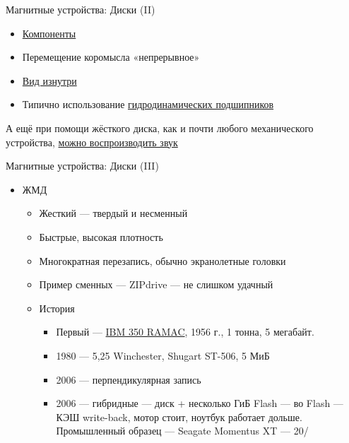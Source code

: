\documentclass[xetex,aspectratio=43]{beamer}
\begin{document}
\begin{frame}{Магнитные устройства: Диски (II)}

\begin{itemize}
\item
  \href{https://en.wikipedia.org/wiki/Hard_disk_drive\#Components}{Компоненты}
\item Перемещение коромысла «непрерывное»
\item
  \href{https://commons.wikimedia.org/w/index.php?title=File\%3AHardDisk1.ogv}{Вид
  изнутри}
\item
  Типично использование
  \href{https://ru.wikipedia.org/wiki/\%D0\%93\%D0\%B8\%D0\%B4\%D1\%80\%D0\%B0\%D0\%B2\%D0\%BB\%D0\%B8\%D1\%87\%D0\%B5\%D1\%81\%D0\%BA\%D0\%B8\%D0\%B5_\%D0\%B8_\%D0\%BF\%D0\%BD\%D0\%B5\%D0\%B2\%D0\%BC\%D0\%B0\%D1\%82\%D0\%B8\%D1\%87\%D0\%B5\%D1\%81\%D0\%BA\%D0\%B8\%D0\%B5_\%D0\%BF\%D0\%BE\%D0\%B4\%D1\%88\%D0\%B8\%D0\%BF\%D0\%BD\%D0\%B8\%D0\%BA\%D0\%B8}{гидродинамических подшипников}
\end{itemize}

\pause

А ещё при помощи жёсткого диска, как и почти любого механического
устройства, \href{https://youtu.be/pmfHHLfbjNQ}{можно воспроизводить
звук}
\end{frame}

\begin{frame}{Магнитные устройства: Диски (III)}

\begin{itemize}
\tightlist
\item
  ЖМД

  \begin{itemize}
  \tightlist
  \item
    Жесткий --- твердый и несменный
  \item
    Быстрые, высокая плотность
  \item
    Многократная перезапись, обычно экранолетные головки
  \item
    Пример сменных --- ZIPdrive --- не слишком удачный
  \item
    История

    \begin{itemize}
    \tightlist
    \item
      Первый --- \href{https://en.wikipedia.org/wiki/IBM_305_RAMAC}{IBM
      350 RAMAC}, 1956 г., 1 тонна, 5 мегабайт.
    \item
      1980 --- 5,25 Winchester, Shugart ST-506, 5 МиБ
    \item
      2006 --- перпендикулярная запись
    \item
      2006 --- гибридные --- диск + несколько ГиБ Flash --- во Flash ---
      КЭШ write-back, мотор стоит, ноутбук работает дольше. Промышленный
      образец --- Seagate Momentus XT --- 20\jobname/
    \end{itemize}
  \end{itemize}
\end{itemize}
\end{frame}
\end{document}
